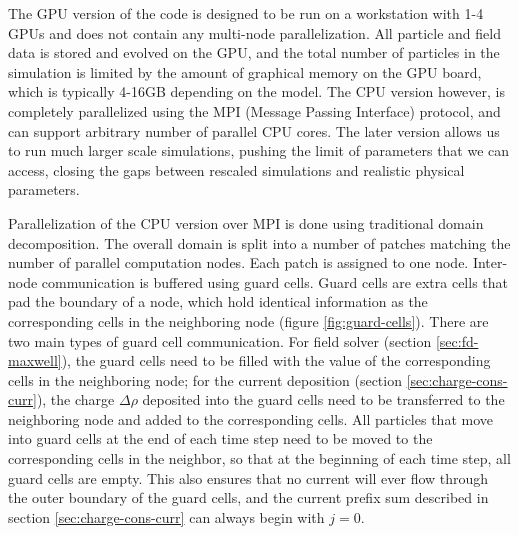 The GPU version of the code is designed to be run on a workstation with 1-4 GPUs
and does not contain any multi-node parallelization. All particle and field data
is stored and evolved on the GPU, and the total number of particles in the
simulation is limited by the amount of graphical memory on the GPU board, which
is typically 4-16GB depending on the model. The CPU version however, is
completely parallelized using the MPI (Message Passing Interface) protocol, and
can support arbitrary number of parallel CPU cores. The later version allows us
to run much larger scale simulations, pushing the limit of parameters that we
can access, closing the gaps between rescaled simulations and realistic physical
parameters.

Parallelization of the CPU version over MPI is done using traditional domain
decomposition. The overall domain is split into a number of patches matching the
number of parallel computation nodes. Each patch is assigned to one node.
Inter-node communication is buffered using guard cells. Guard cells are extra
cells that pad the boundary of a node, which hold identical information as the
corresponding cells in the neighboring node (figure \ref{fig:guard-cells}).
There are two main types of guard cell communication. For field solver (section
\ref{sec:fd-maxwell}), the guard cells need to be filled with the value of the
corresponding cells in the neighboring node; for the current deposition (section
\ref{sec:charge-cons-curr}), the charge $\Delta \rho$ deposited into the guard
cells need to be transferred to the neighboring node and added to the
corresponding cells. All particles that move into guard cells at the end of each
time step need to be moved to the corresponding cells in the neighbor, so that
at the beginning of each time step, all guard cells are empty. This also ensures
that no current will ever flow through the outer boundary of the guard cells,
and the current prefix sum described in section \ref{sec:charge-cons-curr} can
always begin with $j=0$.

